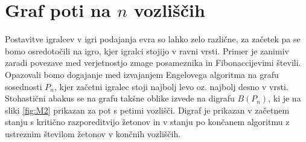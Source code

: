 \documentclass[twoside,11pt]{article}
\begin{document}
\section{Graf poti na $n$ vozliščih}

Postavitve igralcev v igri podajanja evra so lahko zelo različne, za začetek pa se bomo osredotočili na igro, kjer igralci stojijo v ravni vrsti. Primer je zanimiv zaradi povezave med verjetnostjo zmage posameznika in Fibonaccijevimi števili. 
Opazovali bomo dogajanje med izvajanjem Engelovega algoritma na grafu sosednosti $P_n$, kjer začetni igralec stoji najbolj levo oz. najbolj desno v vrsti. Stohastični abakus se na
grafu takšne oblike izvede na digrafu $B(P_{n})$, ki je na sliki \ref{fig:M2} prikazan za pot s petimi vozlišči. Digraf je prikazan v začetnem stanju s kritično razporeditvijo žetonov in v stanju po končanem algoritmu z ustreznim številom žetonov v končnih vozliščih.
\end{document}

